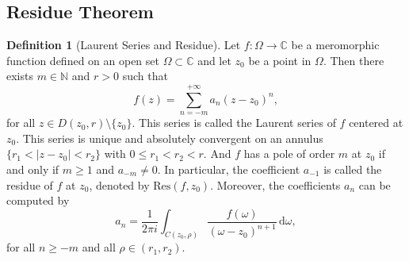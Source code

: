 \documentclass{article}
\theoremstyle{definition}
\newtheorem{definition}[theorem]{Definition}
\newcommand{\N}{\mathbb{N}}
\newcommand{\C}{\mathbb{C}}
\newcommand{\dd}{\mathrm{d}}
\newcommand{\res}{\mathrm{Res}}
\renewcommand{\leq}{\leqslant}
\renewcommand{\geq}{\geqslant}
\begin{document}
\subsection{Residue Theorem}
\begin{definition}[Laurent Series and Residue]
    Let \(f\colon\Omega\to\C\) be a meromorphic function defined on an open set \(\Omega\subset\C\) and let $z_0$ be a point in \(\Omega\). Then there exists $m\in \N$ and $r>0$ such that 
    \begin{equation*}
        f(z) = \sum_{n=-m}^{+\infty} a_n (z-z_0)^n,
    \end{equation*}
    for all \(z\in D(z_0,r)\setminus\{z_0\}\). This series is called the Laurent series of \(f\) centered at \(z_0\). This series is unique and absolutely convergent on an annulus \(\{r_1<|z-z_0|<r_2\}\) with \(0\leq r_1<r_2<r\). 
    And $f$ has a pole of order $m$ at $z_0$ if and only if $m\geq 1$ and $a_{-m}\neq 0$. In particular,
    the coefficient \(a_{-1}\) is called the residue of \(f\) at \(z_0\), denoted by \(\res(f,z_0)\). Moreover, the coefficients \(a_n\) can be computed by
    \begin{equation*}
        a_n = \frac{1}{2\pi i} \int_{C(z_0,\rho)} \frac{f(\omega)}{(\omega-z_0)^{n+1}}\, \dd \omega,
    \end{equation*}
    for all \(n\geq -m\) and all \(\rho\in(r_1,r_2)\).
\end{definition}
\end{document}
